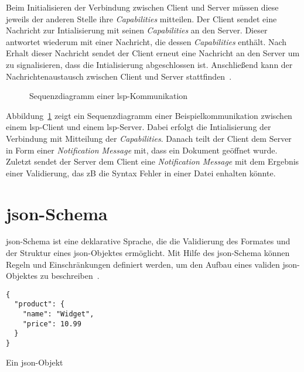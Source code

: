 Beim Initialisieren der Verbindung zwischen Client und Server müssen diese jeweils der anderen Stelle ihre \textit{Capabilities} mitteilen.
Der Client sendet eine Nachricht zur Intialisierung mit seinen \textit{Capabilities} an den Server.
Dieser antwortet wiederum mit einer Nachricht, die dessen \textit{Capabilities} enthält.
Nach Erhalt dieser Nachricht sendet der Client erneut eine Nachricht an den Server um zu signalisieren, dass die Intialisierung abgeschlossen ist.
Anschließend kann der Nachrichtenaustausch zwischen Client und Server stattfinden~\cite{lsp-microsoft,lsp-medium}.

\begin{figure}[htp] %
      \centering
      \caption{Sequenzdiagramm einer \acs{lsp}-Kommunikation}
      \label{fig:lsp-sequence-diagram}
\end{figure}

Abbildung~\ref{fig:lsp-sequence-diagram} zeigt ein Sequenzdiagramm einer Beispielkommunikation zwischen einem \ac{lsp}-Client und einem \ac{lsp}-Server.
Dabei erfolgt die Intialisierung der Verbindung mit Mitteilung der \textit{Capabilities}.
Danach teilt der Client dem Server in Form einer \textit{Notification Message} mit, dass ein Dokument geöffnet wurde.
Zuletzt sendet der Server dem Client eine \textit{Notification Message} mit dem Ergebnis einer Validierung, das \acs{zB} die Syntax Fehler in einer Datei enhalten könnte.

\section{\acs{json}-Schema}

\acs{json}-Schema ist eine deklarative Sprache, die die Validierung des Formates und der Struktur eines \ac{json}-Objektes ermöglicht.
Mit Hilfe des \acs{json}-Schema können Regeln und Einschränkungen definiert werden, um den Aufbau eines validen \ac{json}-Objektes zu beschreiben~\cite{json-schema-description}.

\begin{listing}[htp]
      \begin{verbatim}
{
  "product": {
    "name": "Widget",
    "price": 10.99
  }
}
      \end{verbatim}
      \caption{Ein \acs{json}-Objekt}
      \label{lst:json-object}
\end{listing}

